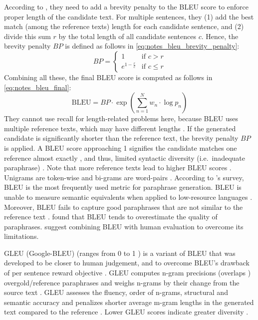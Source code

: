 According to \citet{papineni_bleu_2001}, they need to add a brevity penalty to the BLEU score to enforce proper length of the candidate text. 
For multiple sentences, they (1) add the best match (among the reference texts) length for each candidate sentence, and (2) divide this sum $r$ by the total length of all candidate sentences $c$. 
Hence, the brevity penalty $BP$ is defined as follows in \autoref{eq:notes_bleu_brevity_penalty}:
\begin{equation}
    BP = \begin{cases}
        1 & \text{if } c > r \\
        e^{1 - \frac{r}{c}} & \text{if } c \leq r
    \end{cases}
\label{eq:notes_bleu_brevity_penalty}
\end{equation}
Combining all these, the final BLEU score is computed as follows in \autoref{eq:notes_bleu_final}:
\begin{equation}
    \text{BLEU} = BP \cdot \exp\left(\sum_{n=1}^{N} w_n \cdot \log p_n\right)
\label{eq:notes_bleu_final}
\end{equation}
They cannot use recall for length-related problems here, because BLEU uses multiple reference texts, which may have different lengths \citep{papineni_bleu_2001,banerjee_METEOR_2005}.
If the generated candidate is significantly shorter than the reference text, the brevity penalty $BP$ is applied.
A BLEU score approaching 1 signifies the candidate matches one reference almost exactly \citep{papineni_bleu_2001}, 
and thus, limited syntactic diversity (i.e.\ inadequate paraphrase) \citep{kurt_pehlivanoglu_comparative_2024}.
Note that more reference texts lead to higher BLEU scores \citep{papineni_bleu_2001}.
Unigrams are token-wise and bi-grams are word-pairs \citet{palivela_optimization_2021}.
According to \citet{zhou_paraphrase_2021}'s survey, BLEU is the most frequently used metric for paraphrase generation.
BLEU is unable to measure semantic equivalents \citep{kurt_pehlivanoglu_comparative_2024,zhou_paraphrase_2021} 
when applied to low-resource languages \citep{zhou_paraphrase_2021}.
Moreover, BLEU fails to capture good paraphrases that are not similar to the reference text \citep{zhou_paraphrase_2021}.
\citet{kurt_pehlivanoglu_comparative_2024} found that BLEU tends to overestimate the quality of paraphrases.
\citet{zhou_paraphrase_2021} suggest combining BLEU with human evaluation to overcome its limitations.

GLEU (Google-BLEU) (ranges from 0 to 1 \citep{kurt_pehlivanoglu_comparative_2024}) is a variant of BLEU that was developed to be closer to human judgement, and to 
overcome BLEU's drawback of per sentence reward objective \citep{palivela_optimization_2021}.
GLEU computes n-gram precisions (overlaps \citep{kurt_pehlivanoglu_comparative_2024}) overgold/reference paraphrases 
and weighs n-grams by their change from the source text \citep{palivela_optimization_2021}.
GLEU assesses the fluency, order of n-grams, structural and semantic accuracy 
and penalizes shorter average m-gram lengths in the generated text compared to the reference \citep{kurt_pehlivanoglu_comparative_2024}.
Lower GLEU scores indicate greater diversity \citep{kurt_pehlivanoglu_comparative_2024}.

